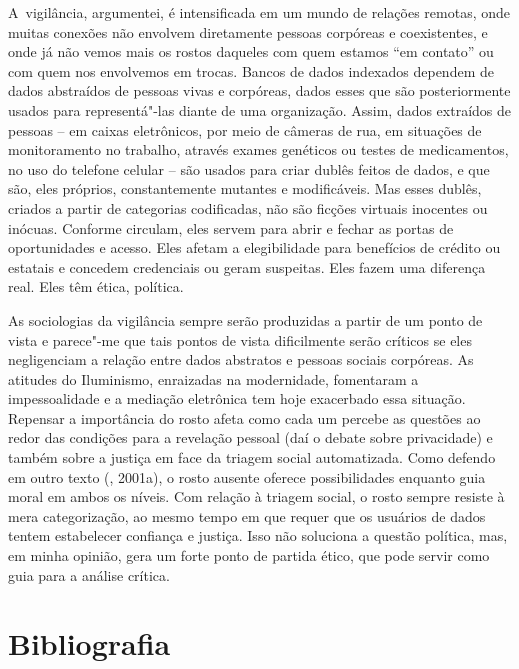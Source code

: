 A~vigilância, argumentei, é intensificada em um mundo de relações
remotas, onde muitas conexões não envolvem diretamente pessoas corpóreas
e coexistentes, e onde já não vemos mais os rostos daqueles com quem
estamos ``em contato'' ou com quem nos envolvemos em trocas. Bancos de
dados indexados dependem de dados abstraídos de pessoas vivas e
corpóreas, dados esses que são posteriormente usados para representá"-las
diante de uma organização. Assim, dados extraídos de pessoas -- em
caixas eletrônicos, por meio de câmeras de rua, em situações de
monitoramento no trabalho, através exames genéticos ou testes de
medicamentos, no uso do telefone celular -- são usados para criar
dublês feitos de dados, e que são, eles próprios, constantemente
mutantes e modificáveis. Mas esses dublês, criados a partir de
categorias codificadas, não são ficções virtuais inocentes ou inócuas.
Conforme circulam, eles servem para abrir e fechar as portas de
oportunidades e acesso. Eles afetam a elegibilidade para benefícios de
crédito ou estatais e concedem credenciais ou geram suspeitas. Eles
fazem uma diferença real. Eles têm ética, política.

As sociologias da vigilância sempre serão produzidas a partir de um
ponto de vista e parece"-me que tais pontos de vista dificilmente serão
críticos se eles negligenciam a relação entre dados abstratos e pessoas
sociais corpóreas. As atitudes do Iluminismo, enraizadas na modernidade,
fomentaram a impessoalidade e a mediação eletrônica tem hoje exacerbado
essa situação. Repensar a importância do rosto afeta como cada um
percebe as questões ao redor das condições para a revelação pessoal (daí
o debate sobre privacidade) e também sobre a justiça em face da triagem
social automatizada. Como defendo em outro texto (, 2001a), o rosto
ausente oferece possibilidades enquanto guia moral em ambos os níveis.
Com relação à triagem social, o rosto sempre resiste à mera
categorização, ao mesmo tempo em que requer que os usuários de dados
tentem estabelecer confiança e justiça. Isso não soluciona a questão
política, mas, em minha opinião, gera um forte ponto de partida ético,
que pode servir como guia para a análise crítica.

\section{Bibliografia}

